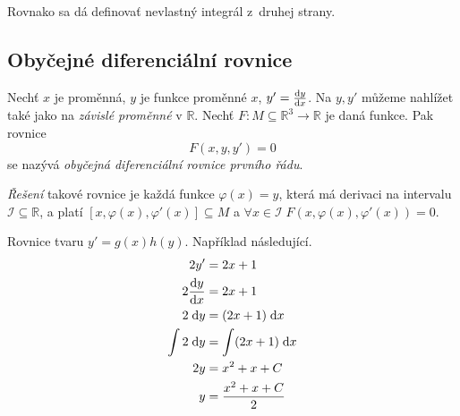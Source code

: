 Rovnako sa dá definovať nevlastný integrál z~druhej strany.

\subsection{Obyčejné diferenciální rovnice}

\begin{definition}
Nechť $x$ je proměnná, $y$ je funkce proměnné $x$, $y' = \dv{y}{x}$.
Na $y, y'$ můžeme nahlížet také jako na {\em závislé proměnné}
v $\mathbb{R}$. Nechť $F : M \subseteq \mathbb{R}^3 \to \mathbb{R}$
je daná funkce. Pak rovnice
\[
    F(x,y,y') = 0
\]
se nazývá {\em obyčejná diferenciální rovnice prvního řádu}.

{\em Řešení} takové rovnice je každá funkce $\varphi(x) = y$,
která má derivaci na intervalu $\mathcal{I} \subseteq \mathbb{R}$,
a platí $[x, \varphi(x), \varphi'(x)] \subseteq M$
a $\forall x \in \mathcal{I} \; F(x, \varphi(x), \varphi'(x)) = 0$.
\end{definition}

\begin{example}
Rovnice tvaru $y' = g(x) h(y)$. Například následující.
\begin{align*}
    2 y'             &=    2x + 1               \\
    2 \dv{y}{x}      &=    2x + 1               \\
    2 \; \text{d}y   &=   (2x + 1) \; \text{d}x \\
    \int 2 \; \text{d}y &= \int (2x + 1) \; \text{d}x \\
    2 y              &= x^2 + x +C               \\
      y              &= \frac{x^2 + x + C}{2}    \\
\end{align*}
\end{example}

